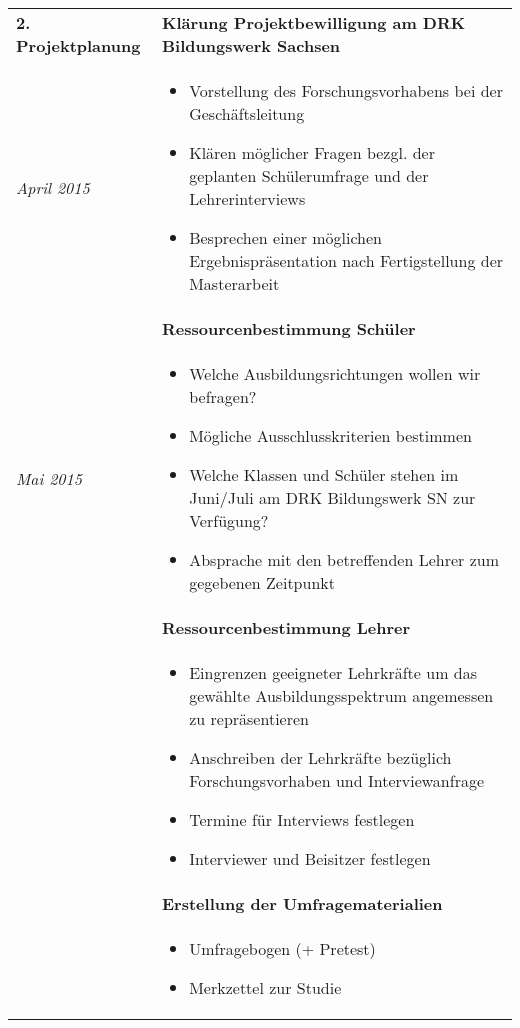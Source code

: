 \begin{longtable}{l|p{9.8cm}}
	\textbf{2. Projektplanung} & \textbf{Klärung Projektbewilligung am DRK Bildungswerk Sachsen} \\
	\emph{April 2015} & 
	\vspace*{-0.6cm}
	\begin{itemize}[nosep,topsep=-0.6cm]
		\item Vorstellung des Forschungsvorhabens bei der Geschäftsleitung
		\item Klären möglicher Fragen bezgl. der geplanten Schülerumfrage und der Lehrerinterviews
		\item Besprechen einer möglichen Ergebnispräsentation nach Fertigstellung der Masterarbeit
	\end{itemize} \\ 
	& \textbf{Ressourcenbestimmung Schüler} \\*
	\emph{Mai 2015} & 
	\vspace*{-0.6cm}
	\begin{itemize}[nosep,topsep=-0.6cm]
		\item Welche Ausbildungsrichtungen wollen wir befragen?
		\item Mögliche Ausschlusskriterien bestimmen
		\item Welche Klassen und Schüler stehen im Juni/Juli am DRK Bildungswerk SN zur Verfügung?
		\item Absprache mit den betreffenden Lehrer zum gegebenen Zeitpunkt
	\end{itemize} \\
	& \textbf{Ressourcenbestimmung Lehrer} \\*
	&
	\vspace*{-0.6cm}
	\begin{itemize}[nosep,topsep=-0.6cm]
		\item Eingrenzen geeigneter Lehrkräfte um das gewählte Ausbildungsspektrum angemessen zu repräsentieren
		\item Anschreiben der Lehrkräfte bezüglich Forschungsvorhaben und Interviewanfrage
		\item Termine für Interviews festlegen
		\item Interviewer und Beisitzer festlegen
	\end{itemize} \\ 
	& \textbf{Erstellung der Umfragematerialien} \\*
	&
	\vspace*{-0.6cm}
	\begin{itemize}[nosep,topsep=-0.6cm]
		\item Umfragebogen (+ Pretest)
		\item Merkzettel zur Studie

\end{itemize}
\end{longtable}

